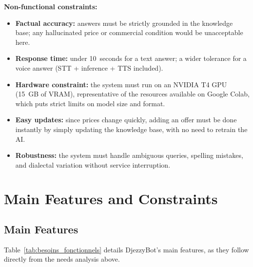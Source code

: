 \documentclass[12pt, a4paper]{report}
\newcommand{\humantext}[1]{#1}      %
\begin{document}
\textbf{Non-functional constraints:}
\begin{itemize}
    \item \humantext{\textbf{Factual accuracy:} answers must be strictly grounded in the knowledge base; any hallucinated price or commercial condition would be unacceptable here.}
    \item \humantext{\textbf{Response time:} under 10~seconds for a text answer; a wider tolerance for a voice answer (STT + inference + TTS included).}
    \item \humantext{\textbf{Hardware constraint:} the system must run on an NVIDIA T4 GPU (15~GB of VRAM), representative of the resources available on Google Colab, which puts strict limits on model size and format.}
    \item \humantext{\textbf{Easy updates:} since prices change quickly, adding an offer must be done instantly by simply updating the knowledge base, with no need to retrain the AI.}
    \item \humantext{\textbf{Robustness:} the system must handle ambiguous queries, spelling mistakes, and dialectal variation without service interruption.}
\end{itemize}


\section{Main Features and Constraints}

\subsection{Main Features}

\humantext{Table~\ref{tab:besoins_fonctionnels} details DjezzyBot's main features, as they follow directly from the needs analysis above.}
\end{document}
